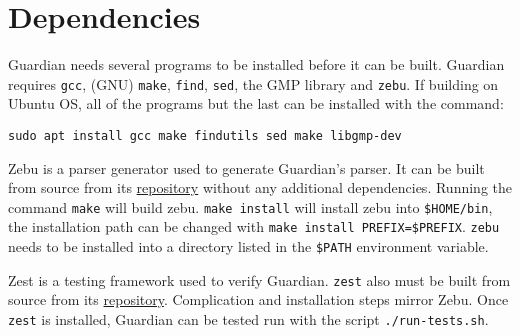 
\section{Dependencies}
{
	Guardian needs several programs to be installed before it can be built.
	Guardian requires \texttt{gcc}, (GNU) \texttt{make}, \texttt{find},
	\texttt{sed}, the GMP library and \texttt{zebu}. If building on Ubuntu OS, all
	of the programs but the last can be installed with the command:
	
	\begin{lstlisting}
sudo apt install gcc make findutils sed make libgmp-dev
	\end{lstlisting}
	
	Zebu is a parser generator used to generate Guardian's parser. It can be
	built from source from its
	\href{https://github.com/ZanderThannhauser/zebu}{repository} without any
	additional dependencies. Running the command \texttt{make} will build zebu.
	\texttt{make install} will install zebu into \texttt{\${HOME}/bin},
	the installation path can be changed with
	\texttt{make install PREFIX=\${PREFIX}}. \texttt{zebu} needs to be installed
	into a directory listed in the \texttt{\${PATH}} environment variable.
	
	Zest is a testing framework used to verify Guardian. \texttt{zest} also must
	be built from source from its
	\href{https://github.com/ZanderThannhauser/zebu}{repository}.
	Complication and installation steps mirror Zebu. Once \texttt{zest} is
	installed, Guardian can be tested run with the script \texttt{./run-tests.sh}.
}



























